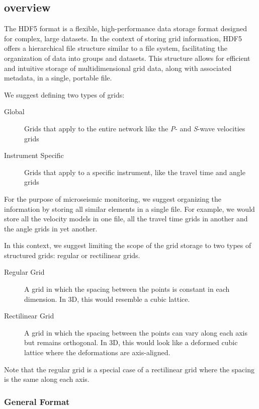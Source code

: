 \subsection{overview}

The HDF5 format is a flexible, high-performance data storage format designed for complex, large datasets. In the context of storing grid information, HDF5 offers a hierarchical file structure similar to a file system, facilitating the organization of data into groups and datasets. This structure allows for efficient and intuitive storage of multidimensional grid data, along with associated metadata, in a single, portable file.

We suggest defining two types of grids: 
\begin{description}
    \item[Global] Grids that apply to the entire network like the \textit{P}- and \textit{S}-wave velocities grids
    \item[Instrument Specific] Grids that apply to a specific instrument, like the travel time and angle grids
\end{description}

For the purpose of microseismic monitoring, we suggest organizing the information by storing all similar elements in a single file. For example, we would store all the velocity models in one file, all the travel time grids in another and the angle grids in yet another. 

In this context, we suggest limiting the scope of the grid storage to two types of structured grids: regular or rectilinear grids. 

\begin{description}
    \item[Regular Grid] A grid in which the spacing between the points is constant in each dimension. In 3D, this would resemble a cubic lattice.

    \item[Rectilinear Grid] A grid in which the spacing between the points can vary along each axis but remains orthogonal. In 3D, this would look like a deformed cubic lattice where the deformations are axis-aligned.
\end{description}

Note that the regular grid is a special case of a rectilinear grid where the spacing is the same along each axis. 

\subsubsection{General Format}

